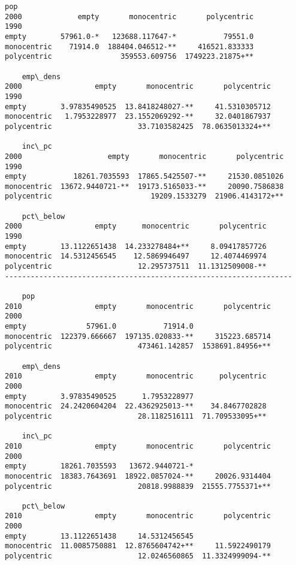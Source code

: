 \documentclass{article}
\begin{document}
    \begin{Verbatim}[commandchars=\\\{\}]
pop
2000             empty       monocentric       polycentric
1990                                                      
empty        57961.0-*   123688.117647-*           79551.0
monocentric    71914.0  188404.046512-**     416521.833333
polycentric                359553.609756  1749223.21875+**

	emp\_dens
2000                 empty       monocentric       polycentric
1990                                                          
empty        3.97835490525  13.8418248027-**     41.5310305712
monocentric   1.7953228977  23.1552069292-**     32.0401867937
polycentric                    33.7103582425  78.0635013324+**

	inc\_pc
2000                    empty       monocentric       polycentric
1990                                                             
empty           18261.7035593  17865.5425507-**     21530.0851026
monocentric  13672.9440721-**  19173.5165033-**     20090.7586838
polycentric                       19209.1533279  21906.4143172+**

	pct\_below
2000                 empty      monocentric       polycentric
1990                                                         
empty        13.1122651438  14.233278484+**     8.09417857726
monocentric  14.5312456545    12.5869946497     12.4074469974
polycentric                    12.295737511  11.1312509008-**
-------------------------------------------------------------------

	pop
2010                 empty       monocentric       polycentric
2000                                                          
empty              57961.0           71914.0                  
monocentric  122379.666667  197135.020833-**     315223.685714
polycentric                    473461.142857  1538691.84956+**

	emp\_dens
2010                 empty       monocentric      polycentric
2000                                                         
empty        3.97835490525      1.7953228977                 
monocentric  24.2420604204  22.4362925013-**    34.8467702828
polycentric                    28.1182516111  71.709533095+**

	inc\_pc
2010                 empty       monocentric       polycentric
2000                                                          
empty        18261.7035593   13672.9440721-*                  
monocentric  18383.7643691  18922.0857024-**     20026.9314404
polycentric                    20818.9988839  21555.7755371+**

	pct\_below
2010                 empty       monocentric       polycentric
2000                                                          
empty        13.1122651438     14.5312456545                  
monocentric  11.0085750881  12.8765604742+**     11.5922490179
polycentric                    12.0246560865  11.3324999094-**
    \end{Verbatim}
\end{document}
